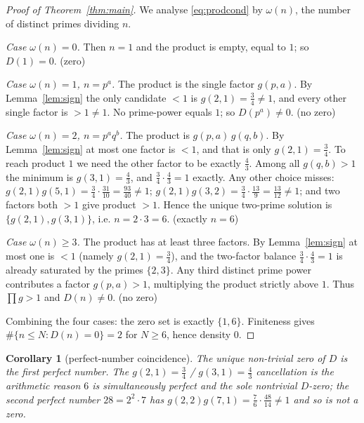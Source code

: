 \documentclass[11pt,a4paper]{article}
\theoremstyle{plain}
\newtheorem{corollary}{Corollary}
\theoremstyle{definition}
\begin{document}
\begin{proof}[Proof of Theorem~\ref{thm:main}]
We analyse \eqref{eq:prodcond} by $\omega(n)$, the number of distinct primes
dividing $n$.

\smallskip\noindent\emph{Case $\omega(n)=0$.} Then $n=1$ and the product is
empty, equal to $1$; so $D(1)=0$. \hfill(zero)

\smallskip\noindent\emph{Case $\omega(n)=1$, $n=p^a$.} The product is the
single factor $g(p,a)$. By Lemma~\ref{lem:sign} the only candidate $<1$ is
$g(2,1)=\tfrac34\neq1$, and every other single factor is $>1\neq1$. No
prime-power equals $1$; so $D(p^a)\neq0$. \hfill(no zero)

\smallskip\noindent\emph{Case $\omega(n)=2$, $n=p^a q^b$.} The product is
$g(p,a)\,g(q,b)$. By Lemma~\ref{lem:sign} at most one factor is $<1$, and that
is only $g(2,1)=\tfrac34$. To reach product $1$ we need the other factor to be
exactly $\tfrac43$. Among all $g(q,b)>1$ the minimum is $g(3,1)=\tfrac43$, and
$\tfrac34\cdot\tfrac43=1$ exactly. Any other choice misses: $g(2,1)g(5,1)=
\tfrac34\cdot\tfrac{31}{10}=\tfrac{93}{40}\neq1$; $g(2,1)g(3,2)=\tfrac34\cdot
\tfrac{13}{9}=\tfrac{13}{12}\neq1$; and two factors both $>1$ give product
$>1$. Hence the unique two-prime solution is $\{g(2,1),g(3,1)\}$, i.e.
$n=2\cdot3=6$. \hfill(exactly $n=6$)

\smallskip\noindent\emph{Case $\omega(n)\ge3$.} The product has at least three
factors. By Lemma~\ref{lem:sign} at most one is $<1$ (namely $g(2,1)=\tfrac34$),
and the two-factor balance $\tfrac34\cdot\tfrac43=1$ is already saturated by the
primes $\{2,3\}$. Any third distinct prime power contributes a factor $g(p,a)>1$,
multiplying the product strictly above $1$. Thus $\prod g>1$ and
$D(n)\neq0$. \hfill(no zero)

\smallskip\noindent Combining the four cases: the zero set is exactly
$\{1,6\}$. Finiteness gives $\#\{n\le N:D(n)=0\}=2$ for $N\ge6$, hence density
$0$.
\end{proof}

\begin{corollary}[perfect-number coincidence]
The unique non-trivial zero of $D$ is the first perfect number. The
$g(2,1)=\tfrac34$ / $g(3,1)=\tfrac43$ cancellation is the arithmetic reason $6$
is simultaneously perfect and the sole nontrivial $D$-zero; the second perfect
number $28=2^2\cdot7$ has $g(2,2)g(7,1)=\tfrac76\cdot\tfrac{48}{14}\neq1$ and so
is \emph{not} a zero.
\end{corollary}
\end{document}
